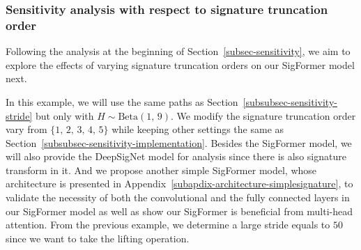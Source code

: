 \documentclass[]{article}
\renewcommand{\(}{\left(}
\renewcommand{\)}{\right)}
\begin{document}
	\begin{table}[H]
	\caption{Test results for SigFormer model, averaged over 3 training runs, with the stride varying from $1$ to $100$. Here the input length equals to $100$.}
	\label{tab-sensitivity-stride}
	\smallskip
	\centering
	\renewcommand\arraystretch{1.5}
	\end{table}
	\subsubsection{Sensitivity analysis with respect to signature truncation order}
	\label{subsubsec-sensitivity-truncation}
	Following the analysis at the beginning of Section~\ref{subsec-sensitivity}, we aim to explore the effects of varying signature truncation orders on our SigFormer model next. 
	
	In this example, we will use the same paths as Section~\ref{subsubsec-sensitivity-stride} but only with $H\sim\text{Beta}(1,\,9)$. We modify the signature truncation order vary from $\{1,\,2,\,3,\,4,\,5\}$ while keeping other settings the same as Section~\ref{subsubsec-sensitivity-implementation}. Besides the SigFormer model, we will also provide the DeepSigNet model for analysis since there is also signature transform in it. And we propose another simple SigFormer model, whose architecture is presented in Appendix~\ref{subapdix-architecture-simplesignature}, to validate the necessity of both the convolutional and the fully connected layers in our SigFormer model as well as show our SigFormer is beneficial from multi-head attention. From the previous example, we determine a large stride equals to $50$ since we want to take the lifting operation.
	
\end{document}

